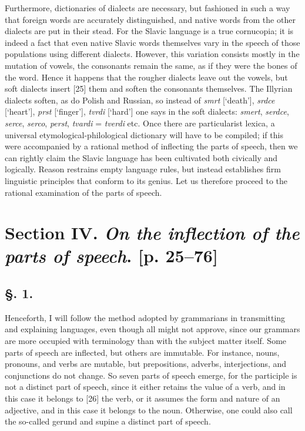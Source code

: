 Furthermore, dictionaries of dialects are necessary, but fashioned in such a way that foreign words are accurately distinguished, and native words from the other dialects are put in their stead. For the Slavic language is a true cornucopia; it is indeed a fact that even native Slavic words themselves vary in the speech of those populations using different dialects. However, this variation consists mostly in the mutation of vowels, the consonants remain the same, as if they were the bones of the word. Hence it happens that the rougher dialects leave out the vowels, but soft dialects insert [25] them and soften the consonants themselves. The Illyrian dialects soften, as do Polish and Russian, so instead of \textit{smrt} [‘death’], \textit{srdce} [‘heart’], \textit{prst} [‘finger’], \textit{tvrdi} [‘hard’] one says in the soft dialects: \textit{smert}, \textit{serdce}, \textit{serce}, \textit{serco}, \textit{perst}, \textit{tvardi} = \textit{tverdi} etc. Once there are particularist lexica, a universal etymological-philological dictionary will have to be compiled; if this were accompanied by a rational method of inflecting the parts of speech, then we can rightly claim the Slavic language has been cultivated both civically and logically. Reason restrains empty language rules, but instead establishes firm linguistic principles that conform to its genius. Let us therefore proceed to the rational examination of the parts of speech.

\section*{Section IV. \textit{On the inflection of the parts of speech}. \linebreak{}[p. 25--76]}

\subsection*{\hspace*{\fill}§. 1.\hspace*{\fill}}

Henceforth, I will follow the method adopted by grammarians in transmitting and explaining languages, even though all might not approve, since our grammars are more occupied with terminology than with the subject matter itself. Some parts of speech are inflected, but others are immutable. For instance, nouns, pronouns, and verbs are mutable, but prepositions, adverbs, interjections, and conjunctions do not change. So seven parts of speech emerge, for the participle is not a distinct part of speech, since it either retains the value of a verb, and in this case it belongs to [26] the verb, or it assumes the form and nature of an adjective, and in this case it belongs to the noun. Otherwise, one could also call the so-called gerund and supine a distinct part of speech.


